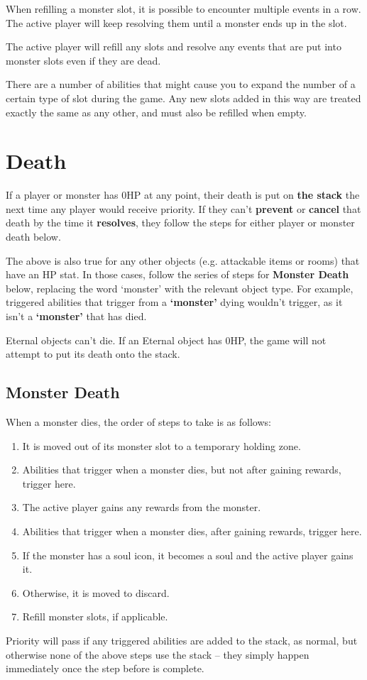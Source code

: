 \documentclass[a4paper, twoside]{report} %
\begin{document}
    When refilling a monster slot, it is possible to encounter multiple events in a row. The active player will keep resolving them until a monster ends up in the slot.

    The active player will refill any slots and resolve any events that are put into monster slots even if they are dead.

    There are a number of abilities that might cause you to expand the number of a certain type of slot during the game. Any new slots added in this way are treated exactly the same as any other, and must also be refilled when empty.

    \chapter{Death}
    \label{death}
    If a player or monster has 0HP at any point, their death is put on \textbf{the stack} the next time any player would receive priority. If they can’t \textbf{prevent} or \textbf{cancel} that death by the time it \textbf{resolves}, they follow the steps for either player or monster death below.

    The above is also true for any other objects (e.g. attackable items or rooms) that have an HP stat. In those cases, follow the series of steps for \textbf{Monster Death} below, replacing the word ‘monster’ with the relevant object type. For example, triggered abilities that trigger from a \textbf{‘monster’} dying wouldn’t trigger, as it isn’t a \textbf{‘monster’} that has died.

    Eternal objects can’t die. If an Eternal object has 0HP, the game will not attempt to put its death onto the stack.

    \section{Monster Death}
    \label{monsterdeath}
    When a monster dies, the order of steps to take is as follows:
    \begin{enumerate}
        \item It is moved out of its monster slot to a temporary holding zone.
        \item Abilities that trigger when a monster dies, but not after gaining rewards, trigger here.
        \item The active player gains any rewards from the monster.
        \item Abilities that trigger when a monster dies, after gaining rewards, trigger here.
        \item If the monster has a soul icon, it becomes a soul and the active player gains it. 
        \item Otherwise, it is moved to discard.
        \item Refill monster slots, if applicable.
    \end{enumerate}
    Priority will pass if any triggered abilities are added to the stack, as normal, but otherwise none of the above steps use the stack – they simply happen immediately once the step before is complete.
\end{document}
